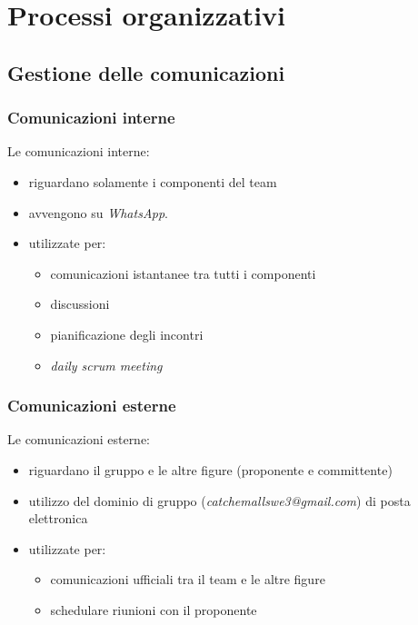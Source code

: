 \section{Processi organizzativi}
    \subsection{Gestione delle comunicazioni}
        \subsubsection{Comunicazioni interne}
        Le comunicazioni interne:
        \begin{itemize}
            \item riguardano solamente i componenti del team 
            \item avvengono su \textit{WhatsApp}.
            \item utilizzate per:
                \begin{itemize}
                    \item comunicazioni istantanee tra tutti i componenti
                    \item discussioni
                    \item pianificazione degli incontri
                    \item \textit{daily scrum meeting} 
                \end{itemize}
        \end{itemize}
            
        \subsubsection{Comunicazioni esterne}
        Le comunicazioni esterne:
        \begin{itemize}
            \item riguardano il gruppo e le altre figure (proponente e committente)
            \item utilizzo del dominio di gruppo (\textit{catchemallswe3@gmail.com}) di posta elettronica
            \item utilizzate per:
            \begin{itemize}
                \item comunicazioni ufficiali tra il team e le altre figure
                \item schedulare riunioni con il proponente
            \end{itemize}
        \end{itemize}

